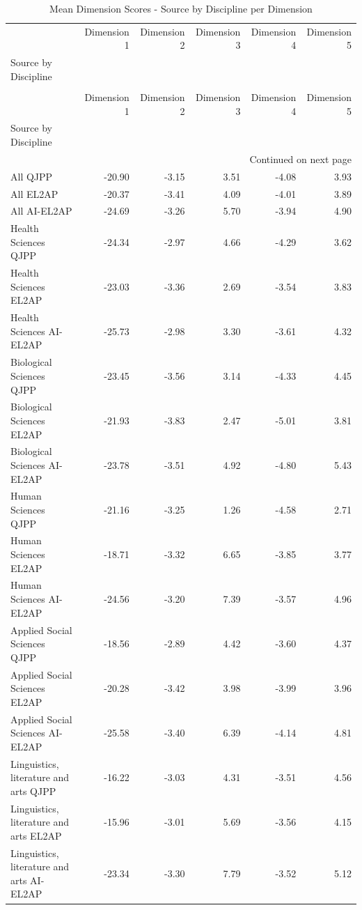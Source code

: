 \begin{longtable}{lrrrrr}
\caption{Mean Dimension Scores - Source by Discipline per Dimension} \label{tab:df_mean_dimension_score} \\
\toprule
 & Dimension 1 & Dimension 2 & Dimension 3 & Dimension 4 & Dimension 5 \\
Source by Discipline &  &  &  &  &  \\
\midrule
\endfirsthead
\caption[]{Mean Dimension Scores - Source by Discipline per Dimension} \\
\toprule
 & Dimension 1 & Dimension 2 & Dimension 3 & Dimension 4 & Dimension 5 \\
Source by Discipline &  &  &  &  &  \\
\midrule
\endhead
\midrule
\multicolumn{6}{r}{Continued on next page} \\
\midrule
\endfoot
\bottomrule
\endlastfoot
All QJPP & -20.90 & -3.15 & 3.51 & -4.08 & 3.93 \\
All EL2AP & -20.37 & -3.41 & 4.09 & -4.01 & 3.89 \\
All AI-EL2AP & -24.69 & -3.26 & 5.70 & -3.94 & 4.90 \\
Health Sciences QJPP & -24.34 & -2.97 & 4.66 & -4.29 & 3.62 \\
Health Sciences EL2AP & -23.03 & -3.36 & 2.69 & -3.54 & 3.83 \\
Health Sciences AI-EL2AP & -25.73 & -2.98 & 3.30 & -3.61 & 4.32 \\
Biological Sciences QJPP & -23.45 & -3.56 & 3.14 & -4.33 & 4.45 \\
Biological Sciences EL2AP & -21.93 & -3.83 & 2.47 & -5.01 & 3.81 \\
Biological Sciences AI-EL2AP & -23.78 & -3.51 & 4.92 & -4.80 & 5.43 \\
Human Sciences QJPP & -21.16 & -3.25 & 1.26 & -4.58 & 2.71 \\
Human Sciences EL2AP & -18.71 & -3.32 & 6.65 & -3.85 & 3.77 \\
Human Sciences AI-EL2AP & -24.56 & -3.20 & 7.39 & -3.57 & 4.96 \\
Applied Social Sciences QJPP & -18.56 & -2.89 & 4.42 & -3.60 & 4.37 \\
Applied Social Sciences EL2AP & -20.28 & -3.42 & 3.98 & -3.99 & 3.96 \\
Applied Social Sciences AI-EL2AP & -25.58 & -3.40 & 6.39 & -4.14 & 4.81 \\
Linguistics, literature and arts QJPP & -16.22 & -3.03 & 4.31 & -3.51 & 4.56 \\
Linguistics, literature and arts EL2AP & -15.96 & -3.01 & 5.69 & -3.56 & 4.15 \\
Linguistics, literature and arts AI-EL2AP & -23.34 & -3.30 & 7.79 & -3.52 & 5.12 \\
\end{longtable}

